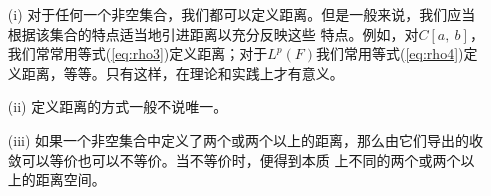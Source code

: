 \begin{note}
    \begin{itemize}
        \item [(i)] 对于任何一个非空集合，我们都可以定义距离。但是一般来说，我们应当根据该集合的特点适当地引进距离以充分反映这些
        特点。例如，对$C[a,\ b]$，我们常常用等式(\ref{eq:rho3})定义距离；对于$L^p(F)$我们常用等式(\ref{eq:rho4})定义距离，等等。只有这样，在理论和实践上才有意义。
        \item [(ii)] 定义距离的方式一般不说唯一。
        \item [(iii)] 如果一个非空集合中定义了两个或两个以上的距离，那么由它们导出的收敛可以等价也可以不等价。当不等价时，便得到本质
        上不同的两个或两个以上的距离空间。
    \end{itemize}
\end{note}